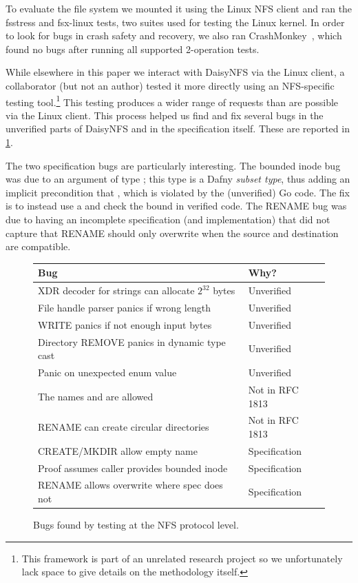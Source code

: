To evaluate the file system we mounted it using the Linux NFS client and ran the
fsstress and fsx-linux tests, two suites used for testing the Linux kernel. In
order to look for bugs in crash safety and recovery, we also ran
CrashMonkey~\cite{mohan:crashmonkey}, which found no bugs
after running all supported 2-operation tests.

While elsewhere in this paper we interact with DaisyNFS via the Linux client, a
collaborator (but not an author) tested it more directly using an NFS-specific
testing tool.\footnote{This framework is part of an
unrelated research project so we unfortunately lack space to give details on
the methodology itself.} This testing produces a wider range of requests than
are possible via the Linux client. This process helped us find and fix several bugs in
the unverified parts of DaisyNFS and in the specification itself. These are
reported in \cref{fig:daisynfs-bugs}.

The two specification bugs are particularly interesting. The bounded inode bug
was due to an  argument of type ; this type is a Dafny
\emph{subset type}, thus adding an implicit precondition that , which is violated by the (unverified) Go code. The fix is to instead
use a  and check the bound in verified code. The RENAME bug was due
to having an incomplete specification (and implementation) that did not capture
that RENAME should only overwrite when the source and destination are
compatible.

\begin{figure}
  \begin{tabular}{@{}p{8cm}p{2.7cm}@{}}
    \toprule
    \textbf{Bug} & \textbf{Why?} \\
    \midrule
    XDR decoder for strings can allocate $2^{32}$ bytes & Unverified \\
    File handle parser panics if wrong length & Unverified \\
    WRITE panics if not enough input bytes & Unverified \\
    Directory REMOVE panics in dynamic type cast & Unverified \\
    Panic on unexpected enum value & Unverified \\
    The names \cc{.} and \cc{..} are allowed & Not in RFC 1813 \\
    RENAME can create circular directories & Not in RFC 1813 \\
    CREATE/MKDIR allow empty name & Specification \\
    Proof assumes caller provides bounded inode & Specification \\
    RENAME allows overwrite where spec does not & Specification \\
    \bottomrule
  \end{tabular}
  \caption{Bugs found by testing at the NFS protocol level.}
  \label{fig:daisynfs-bugs}
\end{figure}

